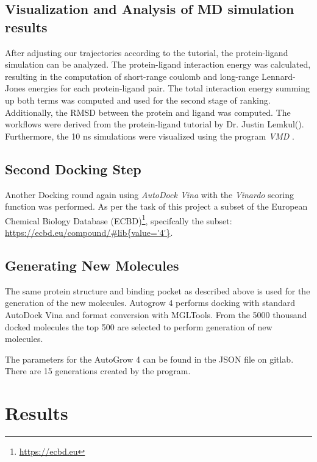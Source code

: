 \documentclass[11pt, letterpaper, titlepage]{article}
\begin{document}
 

 

\subsection{Visualization and Analysis of MD simulation results} 

 

After adjusting our trajectories according to the tutorial, the protein-ligand simulation can be analyzed. The protein-ligand interaction energy was calculated, resulting in the computation of short-range coulomb and long-range Lennard-Jones energies for each protein-ligand pair. The total interaction energy summing up both terms was computed and used for the second stage of ranking. Additionally, the RMSD between the protein and ligand was computed. The workflows were derived from the protein-ligand tutorial by Dr. Justin Lemkul(\cite{Lemkul2019FromPT}). Furthermore, the 10 ns simulations were visualized using the program \emph{VMD} \cite{Humphrey1996VMDVM}.  

\subsection{Second Docking Step} 
 
Another Docking round again using \emph{AutoDock Vina} with the \emph{Vinardo} scoring function was performed. As per the task of this project a subset of the European Chemical Biology Database (ECBD)\footnote{\url{https://ecbd.eu}}, specifcally the subset: \url{https://ecbd.eu/compound/#lib{value='4'}}. 

\subsection{Generating New Molecules}
The same protein structure and binding pocket as described above is used for the generation of the new molecules. Autogrow 4 performs docking with standard AutoDock Vina and format conversion with MGLTools.
From the 5000 thousand docked molecules the top 500 are selected to perform generation of new molecules.

The parameters for the AutoGrow 4 can be found in the JSON file on gitlab. There are 15 generations created by the program. 


\section{Results} 
\end{document}
